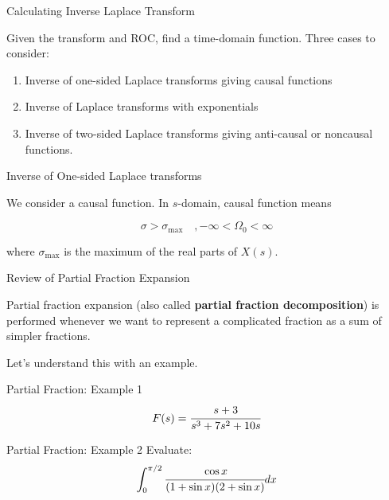 \documentclass[aspectratio=169,xcolor=dvipsnames,svgnames,x11names,fleqn]{beamer}
\begin{document}
\begin{frame}{Calculating Inverse Laplace Transform}

Given the transform and ROC, find a time-domain function.
Three cases to consider:

\begin{enumerate}
    \item Inverse of one-sided Laplace transforms giving causal functions
    \item Inverse of Laplace transforms with exponentials
    \item Inverse of two-sided Laplace transforms giving anti-causal or noncausal functions.
\end{enumerate}    
\end{frame}


\begin{frame}{Inverse of One-sided Laplace transforms}

    We consider a causal function. In $s$-domain, causal function means

    $$\sigma > \sigma_{\text{max}} \quad, -\infty < \Omega_0 < \infty $$

    where $\sigma_{\text{max}}$ is the maximum  of the real parts of $X(s)$.
\end{frame}

\begin{frame}{Review of Partial Fraction Expansion}

Partial fraction expansion (also called \textbf{partial fraction decomposition}) is performed whenever we want to represent a complicated fraction as a sum of simpler fractions. 

Let’s understand this with an example.

\end{frame}


\begin{frame}{Partial Fraction: Example 1}
 \vspace*{-8\baselineskip}
    $$
    F(s) = \cfrac{s+3}{s^3  + 7s^2 + 10s}
    $$
\end{frame}

\begin{frame}{}
\vspace*{-9\baselineskip}
    \color{LightGray}{Blank space for calculation}
\end{frame}



\begin{frame}{Partial Fraction: Example 2}
 \vspace*{-6\baselineskip}
 Evaluate:
    $$
    \int_0^{\pi/2}\cfrac{\cos x }{(1+ \sin x) (2 + \sin x)} dx
    $$
\end{frame}
\end{document}
